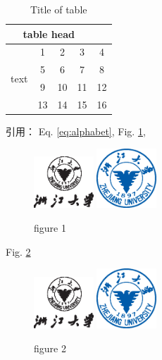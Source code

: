 \documentclass[UTF8,a4paper,10pt, twocolumn]{ctexart}
\begin{document}
	\begin{table}[htbp]
		\caption{Title of table} \label{tab:table}
		\centering
		\addtolength{\tabcolsep}{-0mm} %
		\begin{tabular}{ccccc}
			\toprule[0.75pt]	%
			\multicolumn{4}{c}{table head} \\
			\midrule[0.5pt]	%
			\multirow{4}{*}{text} & 1 & 2 & 3 & 4 \\  %
			& 5 & 6 & 7 & 8 \\
			\cmidrule[0.5pt]{2-4}	%
			& 9 & 10 & 11 & 12 \\
			& 13 & 14 & 15 & 16 \\
			\bottomrule[0.75pt]	%
		\end{tabular}
	\end{table}
	引用： Eq. \eqref{eq:alphabet}, Fig. \ref{figure:zju1},  \\
	\begin{figure}[htbp] 
		\centering
		\includegraphics[width=0.2\textwidth]{fig/ZJU_BLACK.eps}
		\includegraphics[width=0.2\textwidth]{fig/ZJU_BLUE.eps}
		\caption{figure 1}		
		\label{figure:zju1}
	\end{figure}

     Fig. \ref{figure:zju2}
	\begin{figure}[htbp] 		
		\centering
		\includegraphics[width=0.2\textwidth]{fig/ZJU_BLACK.eps}
		\includegraphics[width=0.2\textwidth]{fig/ZJU_BLUE.eps}
		\caption{figure 2}
		\label{figure:zju2}		
	\end{figure}
\end{document}
